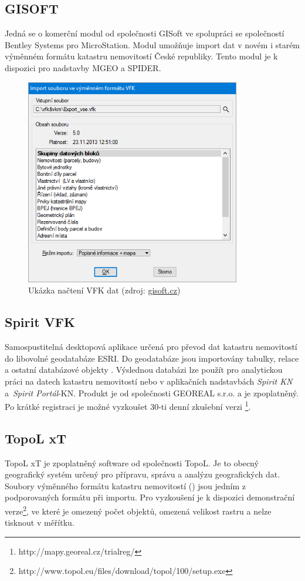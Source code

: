 \subsection{GISOFT}
Jedná se o komerční modul od společnosti GISoft ve spolupráci se
společností Bentley Systems pro MicroStation. Modul umožňuje import
dat v novém i starém výměnném formátu katastru nemovitostí České
republiky. Tento modul je k dispozici pro nadstavby MGEO a
SPIDER.\cite{gisoft}

\begin{figure}[H]
	 \centering
      \includegraphics[height=9cm]{./pictures/gisoft.png}
      \caption{Ukázka načtení VFK dat (zdroj:
\href{http://www.gisoft.cz/cze/files/Moduly/import-vfk.png}{gisoft.cz})}
      \label{fig:gisoft}
  \end{figure}
\subsection{Spirit VFK}
Samospustitelná desktopová aplikace určená pro převod dat katastru
nemovitostí do libovolné geodatabáze ESRI. Do geodatabáze jsou
importovány tabulky, relace a ostatní databázové objekty
. Výslednou databázi lze použít pro analytickou práci na
datech katastru nemovitostí nebo v aplikačních nadstavbách
\textit{Spirit KN} a~\textit{Spirit Portál}-KN. Produkt je od
společnosti GEOREAL s.r.o. a je zpoplatněný. Po krátké registraci je
možné vyzkoušet 30-ti denní zkušební
verzi \footnote{http://mapy.georeal.cz/trialreg/}.\cite{spirit_vfk}
\subsection{TopoL xT}
TopoL xT je zpoplatněný software od společnosti TopoL. Je to obecný
geografický systém určený pro přípravu, správu a analýzu geografických
dat. Soubory výměnného formátu katastru nemovitostí () jsou
jedním z podporovaných formátu při importu. Pro vyzkoušení je k
dispozici demonstrační
verze\footnote{http://www.topol.eu/files/download/topol/100/setup.exe},
ve které je omezený počet objektů, omezená velikost rastru a nelze
tisknout v měřítku.\citep{topol}

